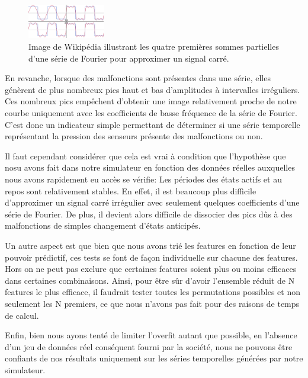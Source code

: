 \documentclass[french]{article}
\theoremstyle{mytheoremstyle}
\theoremstyle{mytheoremstyle}
\theoremstyle{myproblemstyle}
\begin{document}
        \begin{figure}[H]
            \centering
            \includegraphics[width=0.3\textwidth]{images/signal_carre.png}
            \caption{Image de Wikipédia illustrant les quatre premières sommes partielles d'une série de Fourier pour approximer un signal carré.}
            \label{}
        \end{figure}
        
        En revanche, lorsque des malfonctions sont présentes dans une série, elles génèrent de plus nombreux pics haut et bas d'amplitudes à intervalles irréguliers. Ces nombreux pics empêchent d'obtenir une image relativement proche de notre courbe uniquement avec les coefficients de basse fréquence de la série de Fourier. C'est donc un indicateur simple permettant de déterminer si une série temporelle représentant la pression des senseurs présente des malfonctions ou non.
        
        Il faut cependant considérer que cela est vrai à condition que l'hypothèse que nosu avons fait dans notre simulateur en fonction des données réelles auxquelles nous avons rapidement eu accès se vérifie: Les périodes des états actifs et au repos sont relativement stables. En effet, il est beaucoup plus difficile d'approximer un signal carré irrégulier avec seulement quelques coefficients d'une série de Fourier. De plus, il devient alors difficile de dissocier des pics dûs à des malfonctions de simples changement d'états anticipés.
        
    Un autre aspect est que bien que nous avons trié les features en fonction de leur pouvoir prédictif, ces tests se font de façon individuelle sur chacune des features. Hors on ne peut pas exclure que certaines features soient plus ou moins efficaces dans certaines combinaisons. Ainsi, pour être sûr d'avoir l'ensemble réduit de N features le plus efficace, il faudrait tester toutes les permutations possibles et non seulement les N premiers, ce que nous n'avons pas fait pour des raisons de temps de calcul.
    
    Enfin, bien nous ayons tenté de limiter l'overfit autant que possible, en l'absence d'un jeu de données réel conséquent fourni par la société, nous ne pouvons être confiants de nos résultats uniquement sur les séries temporelles générées par notre simulateur.
        
\end{document}
